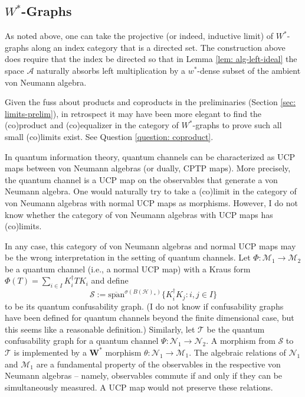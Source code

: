 \documentclass[12pt]{article}
\theoremstyle{definition}
\newenvironment{remark}
  {\pushQED{\qed}\renewcommand{\qedsymbol}{\textcircled{\tiny R}}\remarkx}
  {\popQED\endremarkx}
\newcommand{\Span}{\text{span}}
\newcommand{\mc}[1]{\mathcal{#1}}
\newcommand{\<}{\langle}
\renewcommand{\>}{\rangle}
\begin{document}
\subsection{\texorpdfstring{$W^*$}{}-Graphs}

\begin{remark} \label{rmk: limit of q graphs}
    As noted above, one can take the projective (or indeed, inductive limit) of $W^*$-graphs along an index category that is a directed set. The construction above does require that the index be directed so that in Lemma \ref{lem: alg-left-ideal} the space $\mc A$ naturally absorbs left multiplication by a $w^*$-dense subset of the ambient von Neumann algebra. 
    
    Given the fuss about products and coproducts in the preliminaries (Section \ref{sec: limits-prelim}), in retrospect it may have been more elegant to find the (co)product and (co)equalizer in the category of $W^*$-graphs to prove such all small (co)limits exist. See Question \ref{question: coproduct}.
\end{remark}

\begin{remark} \label{rmk: w*/ucp}
    In quantum information theory, quantum channels can be characterized as UCP maps between von Neumann algebras (or dually, CPTP maps). More precisely, the quantum channel is a UCP map on the observables that generate a von Neumann algebra. One would naturally try to take a (co)limit in the category of von Neumann algebras with normal UCP maps as morphisms. However, I do not know whether the category of von Neumann algebras with UCP maps has (co)limits.
    
    In any case, this category of von Neumann algebras and normal UCP maps may be the wrong interpretation in the setting of quantum channels. Let $\Phi: \mc M_1 \to \mc M_2$ be a quantum channel (i.e., a normal UCP map) with a Kraus form $\Phi(T) = \sum_{i \in I} K_i^\dagger T K_i$ and define 
    \[
    \mc S := \overline{\Span}^{\sigma(B(\mc H)_*)}\{K_i^\dagger K_j : i,j \in I\}
    \]
    to be its quantum confusability graph. (I do not know if confusability graphs have been defined for quantum channels beyond the finite dimensional case, but this seems like a reasonable definition.) Similarly, let $\mc T$ be the quantum confusability graph for a quantum channel $\Psi: \mc N_1 \to \mc N_2$. A morphism from $\mc S$ to $\mc T$ is implemented by a $\mathbf{W^*}$ morphism $\theta: \mc N_1 \to \mc M_1$. The algebraic relations of $\mc N_1$ and $\mc M_1$ are a fundamental property of the observables in the respective von Neumann algebras -- namely, observables commute if and only if they can be simultaneously measured. A UCP map would not preserve these relations.
\end{remark}
\end{document}
